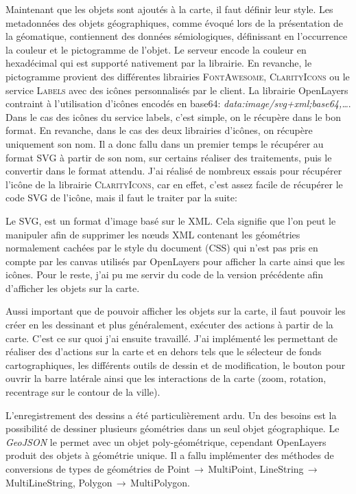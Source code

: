 \documentclass{rapportUHA40}
\begin{document}
Maintenant que les objets sont ajoutés à la carte, il faut définir leur style.
Les metadonnées des objets géographiques, comme évoqué lors de la présentation
de la géomatique, contiennent des données sémiologiques, définissant en
l'occurrence la couleur et le pictogramme de l'objet. Le serveur encode la
couleur en hexadécimal qui est supporté nativement par la librairie. En
revanche, le pictogramme provient des différentes librairies
\textsc{FontAwesome}, \textsc{ClarityIcons} ou le service \textsc{Labels} avec
des icônes personnalisés par le client. La librairie OpenLayers contraint à
l'utilisation d'icônes encodés en base64:
\textit{data:image/svg+xml;base64,\ldots}. Dans le cas des icônes du service
labels, c'est simple, on le récupère dans le bon format. En revanche, dans le
cas des deux librairies d'icônes, on récupère uniquement son nom. Il a donc
fallu dans un premier temps le récupérer au format SVG à partir de son nom, sur
certains réaliser des traitements, puis le convertir dans le format attendu.
J'ai réalisé de nombreux essais pour récupérer l'icône de la librairie
\textsc{ClarityIcons}, car en effet, c'est assez facile de récupérer le code
SVG de l'icône, mais il faut le traiter par la suite:

Le SVG, est un format d'image basé sur le XML\@. Cela signifie que l'on peut le
manipuler afin de supprimer les nœuds XML contenant les géométries normalement
cachées par le style du document (CSS) qui n'est pas pris en compte par les
canvas utilisés par OpenLayers pour afficher la carte ainsi que les icônes.
Pour le reste, j'ai pu me servir du code de la version précédente afin
d'afficher les objets sur la carte.

Aussi important que de pouvoir afficher les objets sur la carte, il faut
pouvoir les créer en les dessinant et plus généralement, exécuter des actions à
partir de la carte. C'est ce sur quoi j'ai ensuite travaillé. J'ai implémenté
les  \fg{} permettant de réaliser des d'actions sur la
carte et en dehors tels que le sélecteur de fonds cartographiques, les
différents outils de dessin et de modification, le bouton pour ouvrir la barre
latérale ainsi que les interactions de la carte (zoom, rotation, recentrage sur
le contour de la ville).

L'enregistrement des dessins a été particulièrement ardu. Un des besoins est la
possibilité de dessiner plusieurs géométries dans un seul objet géographique.
Le \textit{GeoJSON} le permet avec un objet poly-géométrique, cependant
OpenLayers produit des objets à géométrie unique. Il a fallu implémenter des
méthodes de conversions de types de géométries de Point$\,\to\,$MultiPoint,
LineString$\,\to\,$MultiLineString, Polygon$\,\to\,$MultiPolygon.
\end{document}
